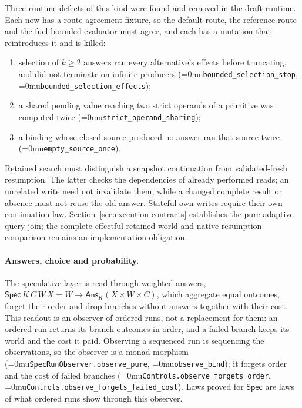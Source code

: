 \documentclass[11pt]{article}
\newcommand{\leanname}[1]{\textup{\Urlmuskip=0mu\relax\nolinkurl{#1}}}
\theoremstyle{definition}
\theoremstyle{remark}
\begin{document}
Three runtime defects of this kind were found and removed in the draft runtime.
Each now has a route-agreement fixture, so the default route, the reference
route and the fuel-bounded evaluator must agree, and each has a mutation that
reintroduces it and is killed:
\begin{enumerate}[leftmargin=*]
\item selection of $k \ge 2$ answers ran every alternative's effects before
  truncating, and did not terminate on infinite producers
  (\leanname{bounded_selection_stop}, \leanname{bounded_selection_effects});
\item a shared pending value reaching two strict operands of a primitive was
  computed twice (\leanname{strict_operand_sharing});
\item a binding whose closed source produced no answer ran that source twice
  (\leanname{empty_source_once}).
\end{enumerate}
Retained search must distinguish a snapshot continuation from validated-fresh
resumption. The latter checks the dependencies of already performed reads;
an unrelated write need not invalidate them, while a changed complete result
or absence must not reuse the old answer. Stateful own writes require their
own continuation law. Section~\ref{sec:execution-contracts} establishes the
pure adaptive-query join; the complete effectful retained-world and native
resumption comparison remains an implementation obligation.

\paragraph{Answers, choice and probability.}
The speculative layer is read through weighted answers,
$\mathsf{Spec}\,K\,C\,W\,X=W\to\mathsf{Ans}_K(X\times W\times C)$, which aggregate
equal outcomes, forget their order and drop branches without answers together
with their cost.  This readout is an observer of ordered runs, not a
replacement for them: an ordered run returns its branch outcomes in order, and
a failed branch keeps its world and the cost it paid.  Observing a sequenced
run is sequencing the observations, so the observer is a monad morphism
(\leanname{SpecRunObserver.observe_pure}, \leanname{observe_bind}); it forgets
order and the cost of failed branches (\leanname{Controls.observe_forgets_order},
\leanname{Controls.observe_forgets_failed_cost}).  Laws proved for
$\mathsf{Spec}$ are laws of what ordered runs show through this observer.
\end{document}
